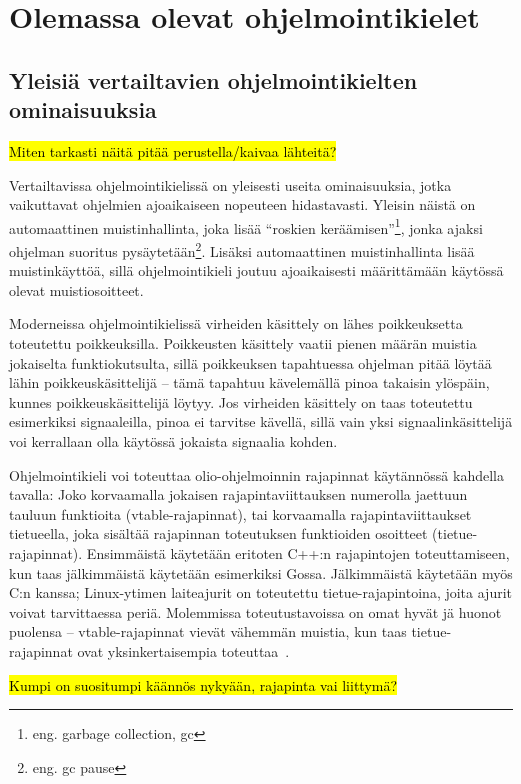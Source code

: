 \section{Olemassa olevat ohjelmointikielet}

\subsection{Yleisiä vertailtavien ohjelmointikielten ominaisuuksia}

\hl{Miten tarkasti näitä pitää perustella/kaivaa lähteitä?}

Vertailtavissa ohjelmointikielissä on yleisesti useita ominaisuuksia, jotka
vaikuttavat ohjelmien ajoaikaiseen nopeuteen hidastavasti. Yleisin näistä on
automaattinen muistinhallinta, joka lisää ``roskien keräämisen''\footnote{eng.
garbage collection, gc}, jonka ajaksi ohjelman suoritus
pysäytetään\footnote{eng. gc pause}. Lisäksi automaattinen muistinhallinta
lisää muistinkäyttöä, sillä ohjelmointikieli joutuu ajoaikaisesti määrittämään
käytössä olevat muistiosoitteet.

Moderneissa ohjelmointikielissä virheiden käsittely on lähes poikkeuksetta
toteutettu poikkeuksilla. Poikkeusten käsittely vaatii pienen määrän muistia
jokaiselta funktiokutsulta, sillä poikkeuksen tapahtuessa ohjelman pitää löytää
lähin poikkeuskäsittelijä -- tämä tapahtuu kävelemällä pinoa takaisin ylöspäin,
kunnes poikkeuskäsittelijä löytyy. Jos virheiden käsittely on taas toteutettu
esimerkiksi signaaleilla, pinoa ei tarvitse kävellä, sillä vain yksi
signaalinkäsittelijä voi kerrallaan olla käytössä jokaista signaalia kohden.

Ohjelmointikieli voi toteuttaa olio-ohjelmoinnin rajapinnat käytännössä kahdella
tavalla: Joko korvaamalla jokaisen rajapintaviittauksen numerolla jaettuun
tauluun funktioita (vtable-rajapinnat), tai korvaamalla rajapintaviittaukset
tietueella, joka sisältää rajapinnan toteutuksen funktioiden osoitteet
(tietue-rajapinnat).  Ensimmäistä käytetään eritoten C++:n rajapintojen
toteuttamiseen, kun taas jälkimmäistä käytetään esimerkiksi Gossa.
Jälkimmäistä käytetään myös C:n kanssa; Linux-ytimen laiteajurit on toteutettu
tietue-rajapintoina, joita ajurit voivat tarvittaessa periä. Molemmissa
toteutustavoissa on omat hyvät jä huonot puolensa -- vtable-rajapinnat vievät
vähemmän muistia, kun taas tietue-rajapinnat ovat yksinkertaisempia
toteuttaa~\citationneeded.

\hl{Kumpi on suositumpi käännös nykyään, rajapinta vai liittymä?}

